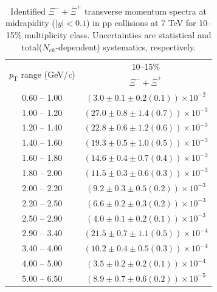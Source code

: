 \begin{table}
\caption{Identified $\Xi^{-} + \bar{\Xi}^{+}$ transverse momentum spectra at midrapidity ($|y|<0.1$) in pp collisions at 7 TeV for 10--15\% multiplicity class. Uncertainties are statistical and total($N_{ch}$-dependent) systematics, respectively.}
\label{tab:XiSum_10to15}
\begin{center}
\begin{tabular}{ c | c }
\hline
\multirow{2}{*}{$p_{\mathrm{T}}$ range (GeV/\textit{c})} & \multicolumn{1}{c}{10--15\%} \\ & $\Xi^{-} + \bar{\Xi}^{+}$\\ 
\hline
0.60 -- 1.00 & $(3.0\pm0.1\pm0.2(0.1))\times10^{-2}$ \\ 
1.00 -- 1.20 & $(27.0\pm0.8\pm1.4(0.7))\times10^{-3}$ \\ 
1.20 -- 1.40 & $(22.8\pm0.6\pm1.2(0.6))\times10^{-3}$ \\ 
1.40 -- 1.60 & $(19.3\pm0.5\pm1.0(0.5))\times10^{-3}$ \\ 
1.60 -- 1.80 & $(14.6\pm0.4\pm0.7(0.4))\times10^{-3}$ \\ 
1.80 -- 2.00 & $(11.5\pm0.3\pm0.6(0.3))\times10^{-3}$ \\ 
2.00 -- 2.20 & $(9.2\pm0.3\pm0.5(0.2))\times10^{-3}$ \\ 
2.20 -- 2.50 & $(6.6\pm0.2\pm0.3(0.2))\times10^{-3}$ \\ 
2.50 -- 2.90 & $(4.0\pm0.1\pm0.2(0.1))\times10^{-3}$ \\ 
2.90 -- 3.40 & $(21.5\pm0.7\pm1.1(0.5))\times10^{-4}$ \\ 
3.40 -- 4.00 & $(10.2\pm0.4\pm0.5(0.3))\times10^{-4}$ \\ 
4.00 -- 5.00 & $(3.5\pm0.2\pm0.2(0.1))\times10^{-4}$ \\ 
5.00 -- 6.50 & $(8.9\pm0.7\pm0.6(0.2))\times10^{-5}$ \\ 
\hline
\end{tabular}
\end{center}
\end{table}
 
